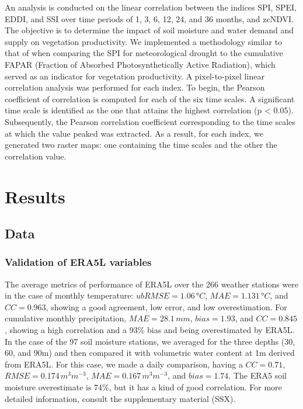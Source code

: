 \documentclass[
  authoryear,
  preprint,
  3p,
  onecolumn]{elsarticle}
\begin{document}
An analysis is conducted on the linear correlation between the indices
SPI, SPEI, EDDI, and SSI over time periods of 1, 3, 6, 12, 24, and 36
months, and zcNDVI. The objective is to determine the impact of soil
moisture and water demand and supply on vegetation productivity. We
implemented a methodology similar to that of \citet{Meroni2016} when
comparing the SPI for meteorological drought to the cumulative FAPAR
(Fraction of Absorbed Photosynthetically Active Radiation), which served
as an indicator for vegetation productivity. A pixel-to-pixel linear
correlation analysis was performed for each index. To begin, the Pearson
coefficient of correlation is computed for each of the six time scales.
A significant time scale is identified as the one that attains the
highest correlation (p \textless{} 0.05). Subsequently, the Pearson
correlation coefficient corresponding to the time scales at which the
value peaked was extracted. As a result, for each index, we generated
two raster maps: one containing the time scales and the other the
correlation value.

\hypertarget{results}{%
\section{Results}\label{results}}

\hypertarget{data-1}{%
\subsection{Data}\label{data-1}}

\hypertarget{validation-of-era5l-variables-1}{%
\subsubsection{Validation of ERA5L
variables}\label{validation-of-era5l-variables-1}}

The average metrics of performance of ERA5L over the 266 weather
stations were in the case of monthly temperature: \(ubRMSE=1.06\,°C\),
\(MAE=1.131\,°C\), and \(CC=0.963\), showing a good agreement, low
error, and low overestimation. For cumulative monthly precipitation,
\(MAE=28.1\,mm\), \(bias=1.93\), and \(CC=0.845\), showing a high
correlation and a 93\% bias and being overestimated by ERA5L. In the
case of the 97 soil moisture stations, we averaged for the three depths
(30, 60, and 90m) and then compared it with volumetric water content at
1m derived from ERA5L. For this case, we made a daily comparison, having
a \(CC=0.71\), \(RMSE=0.174\,m^3m^{-3}\), \(MAE=0.167\,m^3m^{-3}\), and
\(bias=1.74\). The ERA5 soil moisture overestimate is 74\%, but it has a
kind of good correlation. For more detailed information, consult the
supplementary material (SSX).
\end{document}
